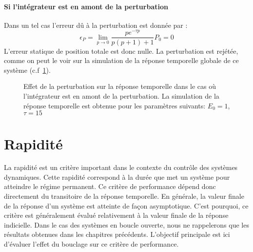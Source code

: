 \paragraph{Si l'intégrateur est en amont de la perturbation}
Dans un tel cas l'erreur dû à la perturbation est donnée par :
$$
\epsilon_P=\lim\limits_{p\to0}\dfrac{pe^{-\tau p}}{p(p+1)+1}P_0=0
$$
L'erreur statique de position totale est donc nulle. La perturbation
est rejétée, comme on peut le voir sur la simulation de la réponse
temporelle globale de ce système (c.f~\cref{fig-pert2}).
\begin{figure}[!h]
    \centering
    
    \caption{Effet de la perturbation sur la réponse temporelle dans le cas
             où l'intégrateur est en amont de la perturbation. La simulation
             de la réponse temporelle est obtenue pour les paramètres suivants: 
             $E_0=1$, $\tau=15$\label{fig-pert2}}
\end{figure}
\clearpage
\section{Rapidité}
La rapidité est un critère important dans le contexte du contrôle des 
systèmes dynamiques. Cette rapidité correspond à la durée que met un 
système pour atteindre le régime permanent. Ce critère de performance 
dépend donc directement du transitoire de la réponse temporelle. 
En générale, la valeur finale de la réponse d'un système est atteinte de 
façon asymptotique. C'est pourquoi, ce critère est généralement évalué 
relativement à la valeur finale de la réponse indicielle. 
Dans le cas des systèmes en boucle ouverte, nous ne rappelerons que les 
résultats obtenues dans les chapitres précédents. 
L'objectif principale est ici d'évaluer l'effet du bouclage sur ce critère 
de performance.

